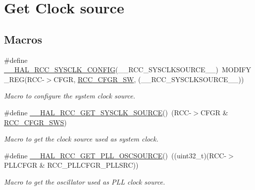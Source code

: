 \hypertarget{group___r_c_c___get___clock__source}{}\section{Get Clock source}
\label{group___r_c_c___get___clock__source}
\subsection*{Macros}
\begin{DoxyCompactItemize}
\item 
\#define \hyperlink{group___r_c_c___get___clock__source_ga32f72b8c5b7e97b415867c57f9fafed6}{\+\_\+\+\_\+\+H\+A\+L\+\_\+\+R\+C\+C\+\_\+\+S\+Y\+S\+C\+L\+K\+\_\+\+C\+O\+N\+F\+IG}(\+\_\+\+\_\+\+R\+C\+C\+\_\+\+S\+Y\+S\+C\+L\+K\+S\+O\+U\+R\+C\+E\+\_\+\+\_\+)~M\+O\+D\+I\+F\+Y\+\_\+\+R\+EG(R\+CC-\/$>$C\+F\+GR, \hyperlink{group___peripheral___registers___bits___definition_ga0eea5e5f7743a7e8995b8beeb18355c1}{R\+C\+C\+\_\+\+C\+F\+G\+R\+\_\+\+SW}, (\+\_\+\+\_\+\+R\+C\+C\+\_\+\+S\+Y\+S\+C\+L\+K\+S\+O\+U\+R\+C\+E\+\_\+\+\_\+))
\begin{DoxyCompactList}\small\item\em Macro to configure the system clock source. \end{DoxyCompactList}\item 
\#define \hyperlink{group___r_c_c___get___clock__source_gac99c2453d9e77c8b457acc0210e754c2}{\+\_\+\+\_\+\+H\+A\+L\+\_\+\+R\+C\+C\+\_\+\+G\+E\+T\+\_\+\+S\+Y\+S\+C\+L\+K\+\_\+\+S\+O\+U\+R\+CE}()~(R\+CC-\/$>$C\+F\+GR \& \hyperlink{group___peripheral___registers___bits___definition_ga15bf2269500dc97e137315f44aa015c9}{R\+C\+C\+\_\+\+C\+F\+G\+R\+\_\+\+S\+WS})
\begin{DoxyCompactList}\small\item\em Macro to get the clock source used as system clock. \end{DoxyCompactList}\item 
\#define \hyperlink{group___r_c_c___get___clock__source_ga3ea1390f8124e2b3b8d53e95541d6e53}{\+\_\+\+\_\+\+H\+A\+L\+\_\+\+R\+C\+C\+\_\+\+G\+E\+T\+\_\+\+P\+L\+L\+\_\+\+O\+S\+C\+S\+O\+U\+R\+CE}()~((uint32\+\_\+t)(R\+CC-\/$>$P\+L\+L\+C\+F\+GR \& R\+C\+C\+\_\+\+P\+L\+L\+C\+F\+G\+R\+\_\+\+P\+L\+L\+S\+RC))
\begin{DoxyCompactList}\small\item\em Macro to get the oscillator used as P\+LL clock source. \end{DoxyCompactList}\end{DoxyCompactItemize}


